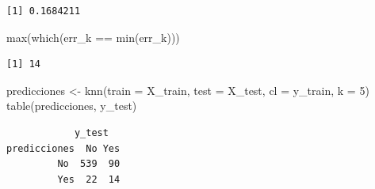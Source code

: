 \documentclass[
  letterpaper,
  DIV=11,
  numbers=noendperiod]{scrartcl}
\newenvironment{Shaded}{\begin{snugshade}}{\end{snugshade}}
\newcommand{\AttributeTok}[1]{\textcolor[rgb]{0.40,0.45,0.13}{#1}}
\newcommand{\DecValTok}[1]{\textcolor[rgb]{0.68,0.00,0.00}{#1}}
\newcommand{\FunctionTok}[1]{\textcolor[rgb]{0.28,0.35,0.67}{#1}}
\newcommand{\NormalTok}[1]{\textcolor[rgb]{0.00,0.23,0.31}{#1}}
\newcommand{\OtherTok}[1]{\textcolor[rgb]{0.00,0.23,0.31}{#1}}
\newcommand{\SpecialCharTok}[1]{\textcolor[rgb]{0.37,0.37,0.37}{#1}}
\begin{document}
\begin{verbatim}
[1] 0.1684211
\end{verbatim}

\begin{Shaded}
\begin{Highlighting}[]
\FunctionTok{max}\NormalTok{(}\FunctionTok{which}\NormalTok{(err\_k }\SpecialCharTok{==} \FunctionTok{min}\NormalTok{(err\_k)))}
\end{Highlighting}
\end{Shaded}

\begin{verbatim}
[1] 14
\end{verbatim}

\begin{Shaded}
\begin{Highlighting}[]
\NormalTok{predicciones }\OtherTok{\textless{}{-}} \FunctionTok{knn}\NormalTok{(}\AttributeTok{train =}\NormalTok{ X\_train, }\AttributeTok{test =}\NormalTok{ X\_test, }\AttributeTok{cl =}\NormalTok{ y\_train, }\AttributeTok{k =} \DecValTok{5}\NormalTok{)}
\FunctionTok{table}\NormalTok{(predicciones, y\_test)}
\end{Highlighting}
\end{Shaded}

\begin{verbatim}
            y_test
predicciones  No Yes
         No  539  90
         Yes  22  14
\end{verbatim}
\end{document}

